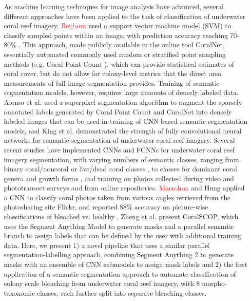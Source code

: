 \documentclass[11pt]{elsarticle}
\newcommand{\revadd}[1]{\textcolor{red}{#1}}
\newcommand{\revdel}[1]{%
  \sbox\revdelbox{#1}%
  \makebox[0pt][l]{\raisebox{0.45ex}{\rule{\wd\revdelbox}{0.4pt}}}\usebox\revdelbox
}
\begin{document}
As machine learning techniques for image analysis have advanced, several different approaches have been applied to the task of classification of underwater coral reef imagery. \revdel{Beijorn}\revadd{Beijbom} used a support vector machine model (SVM) to classify sampled points within an image, with prediction accuracy reaching 70-80\% \citep{beijbom2012}. This approach, made publicly available in the online tool CoralNet, essentially automated commonly used random or stratified point sampling methods (e.g. Coral Point Count \citep{kohlergill2006}), which can provide statistical estimates of coral cover, but do not allow for colony-level metrics that the direct area measurements of full image segmentation provides. Training of semantic segmentation models, however, requires large amounts of densely labeled data. Alonso et al. \citep{alonso2017,alonso2019} used a superpixel segmentation algorithm to augment the sparsely annotated labels generated by Coral Point Count and CoralNet into densely labeled images that can be used in training of CNN-based semantic segmentation models, and King et al. \citep{king2018} demonstrated the strength of fully convolutional neural networks for semantic segmentation of underwater coral reef imagery. Several recent studies have implemented CNNs and FCNNs for underwater coral reef imagery segmentation, with varying numbers of semantic classes, ranging from binary coral/noncoral or live/dead coral classes \citep{zhang2022, kopecky2023}, to classes for dominant coral genera and growth forms  \citep{zhang2024, li2024, lawson2025, zheng2025}, and training on photos collected during video and phototransect surveys and from online repositories. \revdel{Marcohorn}\revadd{Macrohon} and Hung applied a CNN to classify coral photos taken from various angles retrieved from the photosharing site Flickr, and reported 88\% accuracy on picture-wise classifications of bleached vs. healthy \citep{macrohonhung2025}. Zheng et al. \citep{zheng2024} present CoralSCOP, which uses the Segment Anything Model \citep{kirillov2023segment} to generate masks and a parallel semantic branch to assign labels that can be defined by the user with additional training data. Here, we present 1) a novel pipeline that uses a similar parallel segmentation-labelling approach, combining Segment Anything 2 to generate masks with an ensemble of CNN submodels to assign mask labels and 2) the first application of a semantic segmentation approach to automate classification of colony scale bleaching from underwater coral reef imagery, with 8 morpho-taxonomic classes, each further split into separate bleaching classes.
\end{document}
